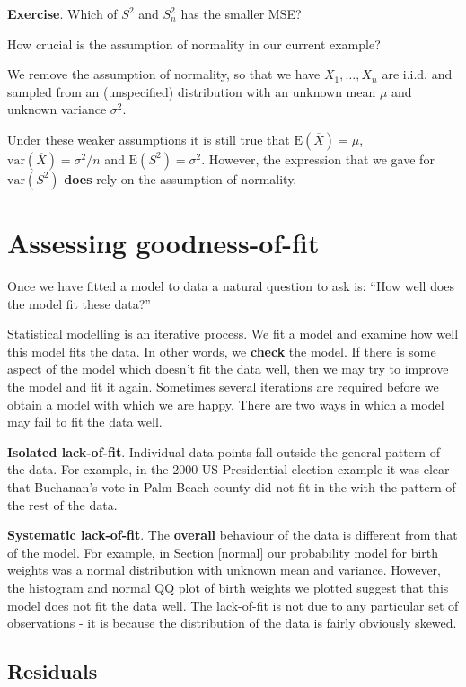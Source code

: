 \documentclass[
  british,
  11pt,
  openany, a4paper]{book}
\begin{document}
\textbf{Exercise}. Which of \(S^2\) and \(S_n^2\) has the smaller MSE?

How crucial is the assumption of normality in our current example?

We remove the assumption of normality, so that we have \(X_1, \ldots, X_n\) are i.i.d. and sampled from an (unspecified) distribution with an unknown mean \(\mu\) and unknown variance \(\sigma^2\).

Under these weaker assumptions it is still true that \(\text{E}(\overline{X})=\mu\), \(\text{var}(\overline{X})=\sigma^2/n\) and \(\text{E}(S^2)=\sigma^2\). However, the expression that we gave for \(\text{var}(S^2)\) \textbf{does} rely on the assumption of normality.

\section{Assessing goodness-of-fit}\label{assessing-goodness-of-fit}

Once we have fitted a model to data a natural question to ask is: ``How well does the model fit these data?''

Statistical modelling is an iterative process. We fit a model and examine how well this model fits the data. In other words, we \textbf{check} the model. If there is some aspect of the model which doesn't fit the data well, then we may try to improve the model and fit it again. Sometimes several iterations are required before we obtain a model with which we are happy. There are two ways in which a model may fail to fit the data well.

\textbf{Isolated lack-of-fit}. Individual data points fall outside the general pattern of the data. For example, in the 2000 US Presidential election example it was clear that Buchanan's vote in Palm Beach county did not fit in the with the pattern of the rest of the data.

\textbf{Systematic lack-of-fit}. The \textbf{overall} behaviour of the data is different from that of the model. For example, in Section \ref{normal} our probability model for birth weights was a normal distribution with unknown mean and variance. However, the histogram and normal QQ plot of birth weights we plotted suggest that this model does not fit the data well. The lack-of-fit is not due to any particular set of observations - it is because the distribution of the data is fairly obviously skewed.

\subsection{Residuals}\label{residuals}
\end{document}
